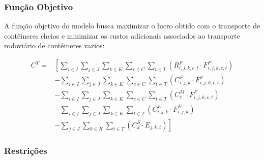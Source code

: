 \documentclass[preprint,10pt,5p]{elsarticle}
\begin{document}
\subsubsection{Função Objetivo}

A função objetivo do modelo busca maximizar o lucro obtido com o transporte de contêineres cheios e minimizar os custos adicionais associados ao transporte rodoviário de contêineres vazios:

\begin{equation}
\begin{aligned}
C^T = & \left[ 
\sum_{i \in I} \sum_{j \in J} \sum_{k \in K} \sum_{c \in C} \sum_{t \in T} 
\left( R_{i,j,k,c,t}^F \cdot F_{i,j,k,c,t}^F \right) \right.\\
& - \sum_{i \in I} \sum_{j \in J} \sum_{k \in K} \sum_{c \in C} \sum_{t \in T} 
\left( C_{i,j,k}^F \cdot F_{i,j,k,c,t}^F \right) \\
& - \sum_{i \in I} \sum_{j \in J} \sum_{k \in K} \sum_{c \in C} \sum_{t \in T} 
\left( C_{c}^M \cdot F_{i,j,k,c,t}^F \right) \\
& - \sum_{i \in I} \sum_{j \in J} \sum_{k \in K} \sum_{t \in T} 
\left( C_{i,j,k}^E \cdot F_{i,j,k}^E \right) \\
& - \left. \sum_{j \in J} \sum_{k \in K} \sum_{t \in T} 
\left( C_{k}^S \cdot E_{j,k,t} \right)
\right]
\end{aligned}
\end{equation}

\subsubsection{Restrições}
\end{document}

